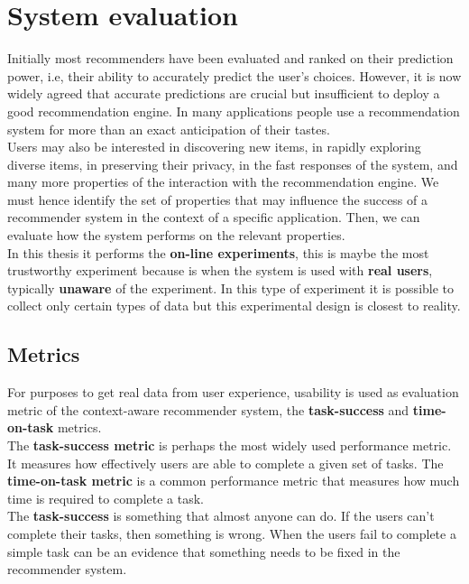 \chapter{System evaluation} \label{evaluation}

Initially most recommenders have been evaluated and ranked on their
prediction power, i.e, their ability to accurately predict the user's
choices. However, it is now widely agreed that accurate predictions
are crucial but insufficient to deploy a good recommendation engine.
In many applications people use a recommendation system for more than
an exact anticipation of their tastes.\\ Users may also be interested
in discovering new items, in rapidly exploring diverse items, in
preserving their privacy, in the fast responses of the system, and
many more properties of the interaction with the recommendation
engine. We must hence identify the set of properties that may
influence the success of a recommender system in the context of a
specific application. Then, we can evaluate how the system performs on
the relevant properties\cite{adomavicius2011context}.\\ In this thesis
it performs the \textbf{on-line experiments}, this is maybe the most
trustworthy experiment because is when the system is  used with
\textbf{real users}, typically \textbf{unaware} of the experiment. In
this type of experiment it is possible to collect only certain types
of data but this experimental design is closest to reality.

\section{Metrics}

For purposes to get real data from user experience, usability is used
as evaluation metric of the context-aware recommender system, the
\textbf{task-success} and \textbf{time-on-task} metrics. \\ 
The \textbf{task-success metric} is perhaps the most widely used
performance metric. It measures how effectively users are able to
complete a given set of tasks.  The \textbf{time-on-task metric} is a
common performance metric that measures how much time is required to
complete a task\cite{albert2013measuring}.\\
The \textbf{task-success} is something that almost anyone can do. 
If the users can't complete their tasks, then something is wrong. 
When the users fail to complete a simple task can be an evidence 
that something needs to be fixed in the recommender system.  \\

